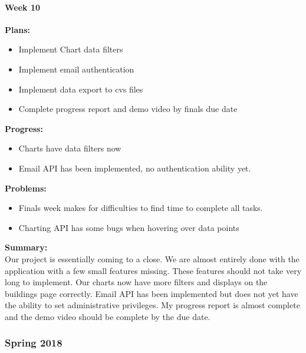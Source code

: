 \paragraph{Week 10}
\begin{adjustwidth}{2.5em}{0pt} 
    \vspace{-0.5cm}\textbf{Plans:}
    \vspace{-0.5cm}
    \begin{itemize}
        \item Implement Chart data filters
        \item Implement email authentication
        \item Implement data export to cvs files
        \item Complete progress report and demo video by finals due date
    \end{itemize} 
    \vspace{-0.3cm}\textbf{Progress:}
    \vspace{-0.5cm}
    \begin{itemize}
        \item Charts have data filters now
        \item Email API has been implemented, no authentication ability yet.
    \end{itemize} 
    \vspace{-0.3cm}\textbf{Problems:}
    \vspace{-0.5cm}
    \begin{itemize}
        \item Finals week makes for difficulties to find time to complete all tasks.
		\item Charting API has some bugs when hovering over data points
    \end{itemize} 
    \vspace{-0.3cm}\noindent\textbf{Summary:}\\
    \noindent Our project is essentially coming to a close. We are almost entirely done with the application with a few small features missing. These features should not take very long to implement. Our charts now have more filters and displays on the buildings page correctly. Email API has been implemented but does not yet have the ability to set administrative privileges. My progress report is almost complete and the demo video should be complete by the due date.
	\end{adjustwidth} 
\subsubsection{Spring 2018}
